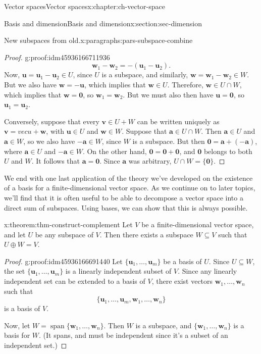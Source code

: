 \documentclass[oneside,10pt,]{book}
\numberwithin{equation}{section}
\newcommand{\spn}{\operatorname{span}}
\newcommand{\uu}{\mathbf{u}}
\newcommand{\vv}{\mathbf{v}}
\newcommand{\ww}{\mathbf{w}}
\begin{document}
\begin{chapterptx}{Vector spaces}{}{Vector spaces}{}{}{x:chapter:ch-vector-space}
\begin{sectionptx}{Basis and dimension}{}{Basis and dimension}{}{}{x:section:sec-dimension}
\begin{paragraphs}{New subspaces from old.}{x:paragraphs:pars-subspace-combine}
\begin{proof}{}{g:proof:idm45936166711936}
\begin{equation*}
\ww_1-\ww_2 = -(\uu_1-\uu_2)\text{.}
\end{equation*}
Now, \(\uu=\uu_1-\uu_2\in U\), since \(U\) is a subspace, and similarly, \(\ww=\ww_1-\ww_2\in W\). But we also have \(\ww=-\uu\), which implies that \(\ww\in U\). Therefore, \(\ww\in U\cap W\), which implies that \(\ww=\mathbf{0}\), so \(\ww_1=\ww_2\). But we must also then have \(\uu=\mathbf{0}\), so \(\uu_1=\uu_2\).%
\par
Conversely, suppose that every \(\vv\in U+W\) can be written uniquely as \(\vv=vec{u}+\ww\), with \(\uu\in U\) and \(\ww\in W\). Suppose that \(\mathbf{a}\in U\cap W\). Then \(\mathbf{a}\in U\) and \(\mathbf{a}\in W\), so we also have \(-\mathbf{a}\in W\), since \(W\) is a subspace. But then \(\mathbf{0}=\mathbf{a}+(-\mathbf{a})\), where \(\mathbf{a}\in U\) and \(-\mathbf{a}\in W\). On the other hand, \(\mathbf{0}=\mathbf{0}+\mathbf{0}\), and \(\mathbf{0}\) belongs to both \(U\) and \(W\). It follows that \(\mathbf{a}=\mathbf{0}\). Since \(\mathbf{a}\) was arbitrary, \(U\cap W = \{\mathbf{0}\}\).%
\end{proof}
We end with one last application of the theory we've developed on the existence of a basis for a finite-dimensional vector space. As we continue on to later topics, we'll find that it is often useful to be able to decompose a vector space into a direct sum of subspaces. Using bases, we can show that this is always possible.%
\begin{theorem}{}{}{x:theorem:thm-construct-complement}%
Let \(V\) be a finite-dimensional vector space, and let \(U\) be any subspace of \(V\). Then there exists a subspace \(W\subseteq V\) such that \(U\oplus W = V\).%
\end{theorem}
\begin{proof}{}{g:proof:idm45936166691440}
Let \(\{\uu_1,\ldots, \uu_m\}\) be a basis of \(U\). Since \(U\subseteq W\), the set \(\{\uu_1,\ldots, \uu_m\}\) is a linearly independent subset of \(V\). Since any linearly independent set can be extended to a basis of \(V\), there exist vectors \(\ww_1,\ldots,\ww_n\) such that%
\begin{equation*}
\{\uu_1,\ldots, \uu_m,\ww_1,\ldots, \ww_n\}
\end{equation*}
is a basis of \(V\).%
\par
Now, let \(W = \spn\{\ww_1,\ldots, \ww_n\}\). Then \(W\) is a subspace, and \(\{\ww_1,\ldots, \ww_n\}\) is a basis for \(W\). (It spans, and must be independent since it's a subset of an independent set.)%

\end{proof}
\end{paragraphs}
\end{sectionptx}
\end{chapterptx}
\end{document}
